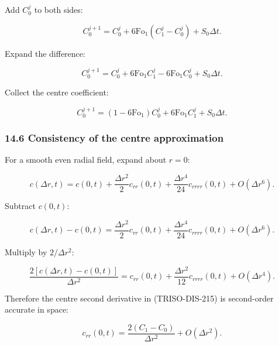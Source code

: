 \documentclass[11pt,a4paper]{article}
\begin{document}
Add $C_0^j$ to both sides:

\begin{equation}
\boxed{
C_0^{j+1}
=
C_0^j
+
6\mathrm{Fo}_1
(C_1^j-C_0^j)
+
S_0\Delta t.
}
\tag{TRISO-DIS-225}
\label{eq:triso-dis-225}
\end{equation}

Expand the difference:

\begin{equation}
C_0^{j+1}
=
C_0^j
+
6\mathrm{Fo}_1C_1^j
-
6\mathrm{Fo}_1C_0^j
+
S_0\Delta t.
\tag{TRISO-DIS-226}
\label{eq:triso-dis-226}
\end{equation}

Collect the centre coefficient:

\begin{equation}
\boxed{
C_0^{j+1}
=
(1-6\mathrm{Fo}_1)C_0^j
+
6\mathrm{Fo}_1C_1^j
+
S_0\Delta t.
}
\tag{TRISO-DIS-227}
\label{eq:triso-dis-227}
\end{equation}

\subsubsection*{14.6 Consistency of the centre approximation}

For a smooth even radial field, expand about $r=0$:

\begin{equation}
c(\Delta r,t)
=
c(0,t)
+
\frac{\Delta r^2}{2}c_{rr}(0,t)
+
\frac{\Delta r^4}{24}c_{rrrr}(0,t)
+
O(\Delta r^6).
\tag{TRISO-DIS-228}
\label{eq:triso-dis-228}
\end{equation}

Subtract $c(0,t)$:

\begin{equation}
c(\Delta r,t)-c(0,t)
=
\frac{\Delta r^2}{2}c_{rr}(0,t)
+
\frac{\Delta r^4}{24}c_{rrrr}(0,t)
+
O(\Delta r^6).
\tag{TRISO-DIS-229}
\label{eq:triso-dis-229}
\end{equation}

Multiply by $2/\Delta r^2$:

\begin{equation}
\frac{
2[c(\Delta r,t)-c(0,t)]
}{
\Delta r^2
}
=
c_{rr}(0,t)
+
\frac{\Delta r^2}{12}c_{rrrr}(0,t)
+
O(\Delta r^4).
\tag{TRISO-DIS-230}
\label{eq:triso-dis-230}
\end{equation}

Therefore the centre second derivative in (TRISO-DIS-215) is second-order accurate in space:

\begin{equation}
c_{rr}(0,t)
=
\frac{
2(C_1-C_0)
}{
\Delta r^2
}
+
O(\Delta r^2).
\tag{TRISO-DIS-231}
\label{eq:triso-dis-231}
\end{equation}
\end{document}
